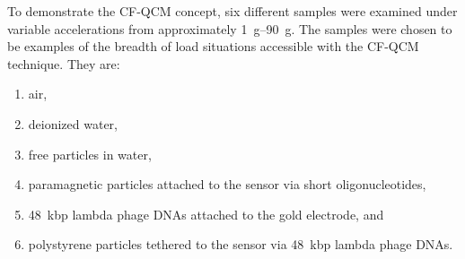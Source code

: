 To demonstrate the CF-QCM concept, six different samples were examined
under variable accelerations from approximately \SIrange{1}{90}{g}.  The
samples were chosen to be examples of the breadth of load situations
accessible with the CF-QCM technique.  They are:
\begin{enumerate}
\item air,
\item deionized water,
\item free particles in water,
\item paramagnetic particles attached to the sensor via short oligonucleotides,
\item \SI{48}{kbp} lambda phage DNAs attached to the gold electrode, and
\item polystyrene particles tethered to the sensor via \SI{48}{kbp} lambda phage DNAs.
\end{enumerate}

